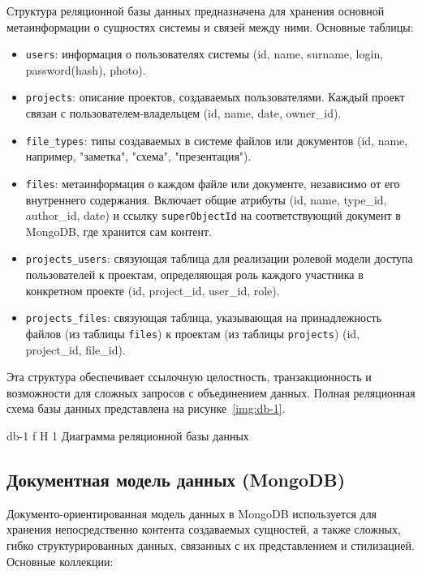 Структура реляционной базы данных предназначена для хранения основной метаинформации о сущностях системы и связей между ними. 
Основные таблицы:

\begin{itemize}
    \item \texttt{users}: информация о пользователях системы (id, name, surname, login, password(hash), photo).
    \item \texttt{projects}: описание проектов, создаваемых пользователями. Каждый проект связан с пользователем-владельцем (id, name, date, owner\_id).
    \item \texttt{file\_types}: типы создаваемых в системе файлов или документов (id, name, например, "заметка", "схема", "презентация").
    \item \texttt{files}: метаинформация о каждом файле или документе, независимо от его внутреннего содержания. Включает общие атрибуты (id, name, type\_id, author\_id, date) и ссылку \texttt{superObjectId} на соответствующий документ в MongoDB, где хранится сам контент.
    \item \texttt{projects\_users}: связующая таблица для реализации ролевой модели доступа пользователей к проектам, определяющая роль каждого участника в конкретном проекте (id, project\_id, user\_id, role).
    \item \texttt{projects\_files}: связующая таблица, указывающая на принадлежность файлов (из таблицы \texttt{files}) к проектам (из таблицы \texttt{projects}) (id, project\_id, file\_id).
\end{itemize}

Эта структура обеспечивает ссылочную целостность, транзакционность и возможности для сложных запросов с объединением данных. 
\clearpage
Полная реляционная схема базы данных представлена на рисунке~\ref{img:db-1}.

	{db-1}
	{f}
	{H}
	{1\textwidth}
	{Диаграмма реляционной базы данных}

\subsection{Документная модель данных (MongoDB)}

Документо-ориентированная модель данных в MongoDB используется для хранения непосредственно контента создаваемых сущностей, а также сложных, гибко структурированных данных, связанных с их представлением и стилизацией.
\clearpage
Основные коллекции:

